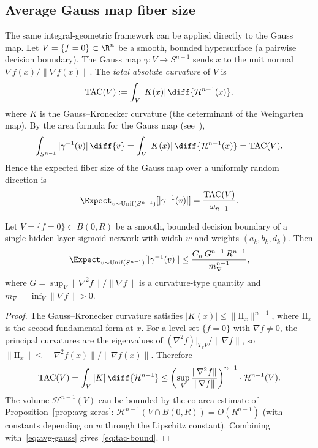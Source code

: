 \subsection{Average Gauss map fiber size}

The same integral-geometric framework can be applied directly to the Gauss map. Let $V = \{f = 0\}\subset \R^n$ be a smooth, bounded hypersurface (a pairwise decision boundary). The Gauss map $\gamma\colon V\to S^{n-1}$ sends $x$ to the unit normal $\nabla f(x)/\|\nabla f(x)\|$. The \emph{total absolute curvature} of $V$ is
\begin{equation*}
  \mathrm{TAC}(V) := \int_V |K(x)|\,\diff{\mathcal{H}^{n-1}(x)},
\end{equation*}
where $K$ is the Gauss--Kronecker curvature (the determinant of the Weingarten map). By the area formula for the Gauss map (see~\cite[Section~3.2]{gray2004tubes}),
\begin{equation}\label{eq:gauss-area}
  \int_{S^{n-1}} |\gamma^{-1}(v)|\,\diff{v} = \int_V |K(x)|\,\diff{\mathcal{H}^{n-1}(x)} = \mathrm{TAC}(V).
\end{equation}
Hence the expected fiber size of the Gauss map over a uniformly random direction is
\begin{equation}\label{eq:avg-gauss}
  \Expect_{v\sim \mathrm{Unif}(S^{n-1})} [|\gamma^{-1}(v)|] = \frac{\mathrm{TAC}(V)}{\omega_{n-1}}.
\end{equation}

\begin{proposition}\label{prop:avg-gauss}
Let $V = \{f = 0\}\subset B(0,R)$ be a smooth, bounded decision boundary of a single-hidden-layer sigmoid network with width $w$ and weights $(a_k, b_k, d_k)$. Then
\begin{equation}\label{eq:tac-bound}
  \Expect_{v\sim \mathrm{Unif}(S^{n-1})}[|\gamma^{-1}(v)|] \leq \frac{C_n\, G^{n-1}\, R^{n-1}}{m_{\nabla}^{n-1}},
\end{equation}
where $G = \sup_V \|\nabla^2 f\| / \|\nabla f\|$ is a curvature-type quantity and $m_\nabla = \inf_V \|\nabla f\| > 0$.
\end{proposition}

\begin{proof}
The Gauss--Kronecker curvature satisfies $|K(x)| \leq \|\mathrm{II}_x\|^{n-1}$, where $\mathrm{II}_x$ is the second fundamental form at $x$. For a level set $\{f=0\}$ with $\nabla f\neq 0$, the principal curvatures are the eigenvalues of $(\nabla^2 f)|_{T_x V}/\|\nabla f\|$, so $\|\mathrm{II}_x\| \leq \|\nabla^2 f(x)\|/\|\nabla f(x)\|$. Therefore
\begin{equation*}
  \mathrm{TAC}(V) = \int_V |K|\,\diff{\mathcal{H}^{n-1}} \leq \left(\sup_V \frac{\|\nabla^2 f\|}{\|\nabla f\|}\right)^{n-1}\cdot \mathcal{H}^{n-1}(V).
\end{equation*}
The volume $\mathcal{H}^{n-1}(V)$ can be bounded by the co-area estimate of Proposition~\ref{prop:avg-zeros}: $\mathcal{H}^{n-1}(V\cap B(0,R)) = O(R^{n-1})$ (with constants depending on $w$ through the Lipschitz constant). Combining with~\eqref{eq:avg-gauss} gives~\eqref{eq:tac-bound}.
\end{proof}

